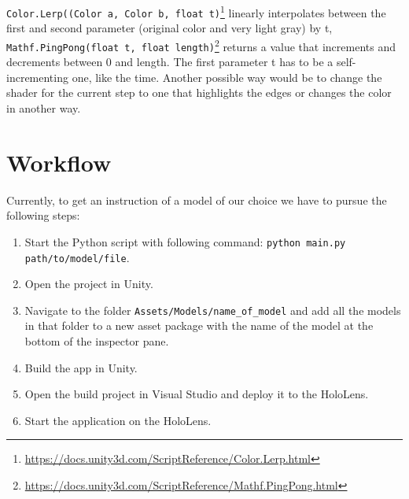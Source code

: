 \verb|Color.Lerp((Color a, Color b, float t)|\footnote{\url{https://docs.unity3d.com/ScriptReference/Color.Lerp.html}} linearly interpolates between the first and second parameter (original color and very light gray) by t, \newline \verb|Mathf.PingPong(float t, float length)|\footnote{\url{https://docs.unity3d.com/ScriptReference/Mathf.PingPong.html}} returns a value that increments and decrements between 0 and length. The first parameter t has to be a self-incrementing one, like the time.\newline
Another possible way would be to change the shader for the current step to one that highlights the edges or changes the color in another way.

\section{Workflow}
Currently, to get an instruction of a model of our choice we have to pursue the following steps:
\begin{enumerate}
	\item
	Start the Python script with following command: \newline
	\verb|python main.py path/to/model/file|.
	
	\item
	Open the project in Unity.
	
	\item
	Navigate to the folder \verb|Assets/Models/name_of_model| and add all the models in that folder to a new asset package with the name of the model at the bottom of the inspector pane.
		
	\item
	Build the app in Unity.
	
	\item
	Open the build project in Visual Studio and deploy it to the HoloLens.
	
	\item
	Start the application on the HoloLens.
\end{enumerate}




